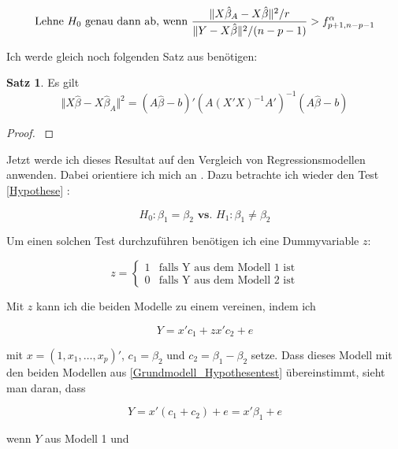 \documentclass[12pt,a4paper]{article}
\theoremstyle{definition}
\theoremstyle{definition}
\newtheorem{Satz}[Definition]{Satz}
\theoremstyle{definition}
\begin{document}
\begin{equation}
\textnormal{Lehne }  H_0 \textnormal{ genau dann ab, wenn } \frac{\Vert X \hat{\beta}_A - X\hat{\beta} \Vert^2 / r}{\Vert Y - X \hat{\beta} \Vert^2 / (n-p-1)} > f_{p+1,n-p-1}^{\alpha} \label{Einschränkung_Test}
\end{equation}

Ich werde gleich noch folgenden Satz aus \cite[13]{Liu64} benötigen:

\begin{Satz}
Es gilt 
\[
\Vert X \hat{\beta} - X \hat{\beta}_A \Vert^2 = (A\hat{\beta}-b)'(A(X'X)^{-1}A')^{-1}(A\hat{\beta}-b)
\]
\end{Satz}

\begin{proof}
\cite[13]{Liu64}
\end{proof}


Jetzt werde ich dieses Resultat auf den Vergleich von Regressionsmodellen anwenden. Dabei orientiere ich mich an \cite[114]{Liu64}. Dazu betrachte ich wieder den Test \eqref{Hypothese} :

\begin{equation*}
H_{0} : \beta_{1} = \beta_{2}  \textbf{ vs. }  H_{1} : \beta_{1} \neq \beta_{2}
\end{equation*}

Um einen solchen Test durchzuführen benötigen ich eine Dummyvariable $z$:

\[
z=\begin{cases}
1 & \text{falls Y aus dem Modell 1 ist}\\
0 & \text{falls Y aus dem Modell 2 ist} 
\end{cases}
\]

Mit $z$ kann ich die beiden Modelle zu einem vereinen, indem ich

\begin{equation}
Y = x' c_1 + z x' c_2 + e \label{Grundmodell_umformuliert}
\end{equation}

mit $x=(1,x_1,\ldots,x_p)'$, $c_1=\beta_2$ und $c_2=\beta_1-\beta_2$ setze. Dass dieses Modell mit den beiden Modellen aus \eqref{Grundmodell_Hypothesentest} übereinstimmt, sieht man daran, dass

\begin{equation*}
Y = x'(c_1+c_2)+e = x'\beta_1+e
\end{equation*}

wenn $Y$ aus Modell 1 und 
\end{document}
